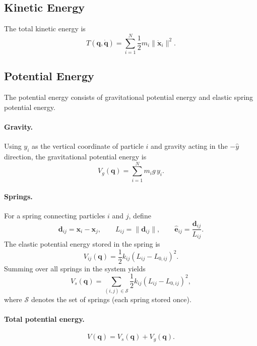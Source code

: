 \documentclass[manuscript,nonacm,12pt,letterpaper]{acmart}
\begin{document}
\subsection{Kinetic Energy}
\label{Sec5.2:Kinetic}

The total kinetic energy is
\begin{equation}
T(\mathbf{q},\dot{\mathbf{q}})
=
\sum_{i=1}^{N} \frac{1}{2} m_i \|\dot{\mathbf{x}}_i\|^2.
\label{eq:lag_kinetic}
\end{equation}

\subsection{Potential Energy}
\label{Sec5.3:Potential}

The potential energy consists of gravitational potential energy and elastic spring potential energy.

\paragraph{Gravity.}
Using $y_i$ as the vertical coordinate of particle $i$ and gravity acting in the $-\hat{y}$ direction, the gravitational potential energy is
\begin{equation}
V_g(\mathbf{q}) = \sum_{i=1}^{N} m_i g\, y_i.
\label{eq:lag_gravity_potential}
\end{equation}

\paragraph{Springs.}
For a spring connecting particles $i$ and $j$, define
\[
\mathbf{d}_{ij} = \mathbf{x}_i - \mathbf{x}_j,\qquad
L_{ij} = \|\mathbf{d}_{ij}\|,\qquad
\hat{\mathbf{e}}_{ij} = \frac{\mathbf{d}_{ij}}{L_{ij}}.
\]
The elastic potential energy stored in the spring is
\begin{equation}
V_{ij}(\mathbf{q}) = \frac{1}{2} k_{ij} (L_{ij} - L_{0,ij})^2.
\label{eq:lag_spring_potential}
\end{equation}
Summing over all springs in the system yields
\begin{equation}
V_s(\mathbf{q}) = \sum_{(i,j)\in \mathcal{S}} \frac{1}{2} k_{ij} (L_{ij} - L_{0,ij})^2,
\label{eq:lag_total_spring_potential}
\end{equation}
where $\mathcal{S}$ denotes the set of springs (each spring stored once).

\paragraph{Total potential energy.}
\begin{equation}
V(\mathbf{q}) = V_s(\mathbf{q}) + V_g(\mathbf{q}).
\label{eq:lag_total_potential}
\end{equation}
\end{document}
